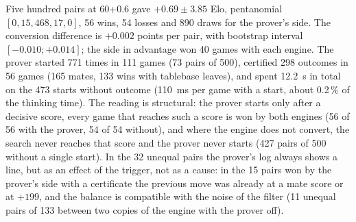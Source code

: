 \documentclass{article}
\theoremstyle{plain}
\theoremstyle{definition}
\theoremstyle{remark}
\begin{document}
{\sloppy Five hundred pairs at 60+0.6 gave $+0.69 \pm 3.85$ Elo, pentanomial $[0, 15, 468, 17, 0]$, 56 wins, 54 losses and 890 draws for the prover's side. The conversion difference is $+0.002$ points per pair, with bootstrap interval $[-0.010; +0.014]$; the side in advantage won 40 games with each engine. The prover started 771 times in 111 games (73 pairs of 500), certified 298 outcomes in 56 games (165 mates, 133 wins with tablebase leaves), and spent 12.2~s in total on the 473 starts without outcome (110~ms per game with a start, about 0.2\,\% of the thinking time). The reading is structural: the prover starts only after a decisive score, every game that reaches such a score is won by both engines (56 of 56 with the prover, 54 of 54 without), and where the engine does not convert, the search never reaches that score and the prover never starts (427 pairs of 500 without a single start). In the 32 unequal pairs the prover's log always shows a line, but as an effect of the trigger, not as a cause: in the 15 pairs won by the prover's side with a certificate the previous move was already at a mate score or at $+199$, and the balance is compatible with the noise of the filter (11 unequal pairs of 133 between two copies of the engine with the prover off).\par}
\end{document}
